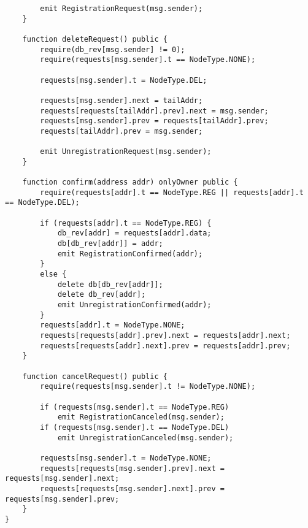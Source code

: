\begin{verbatim}
        emit RegistrationRequest(msg.sender);
    }

    function deleteRequest() public {
        require(db_rev[msg.sender] != 0);
        require(requests[msg.sender].t == NodeType.NONE);

        requests[msg.sender].t = NodeType.DEL;

        requests[msg.sender].next = tailAddr;
        requests[requests[tailAddr].prev].next = msg.sender;
        requests[msg.sender].prev = requests[tailAddr].prev;
        requests[tailAddr].prev = msg.sender;

        emit UnregistrationRequest(msg.sender);
    }

    function confirm(address addr) onlyOwner public {
        require(requests[addr].t == NodeType.REG || requests[addr].t == NodeType.DEL);

        if (requests[addr].t == NodeType.REG) {
            db_rev[addr] = requests[addr].data;
            db[db_rev[addr]] = addr;
            emit RegistrationConfirmed(addr);
        }
        else {
            delete db[db_rev[addr]];
            delete db_rev[addr];
            emit UnregistrationConfirmed(addr);
        }
        requests[addr].t = NodeType.NONE;
        requests[requests[addr].prev].next = requests[addr].next;
        requests[requests[addr].next].prev = requests[addr].prev;
    }

    function cancelRequest() public {
        require(requests[msg.sender].t != NodeType.NONE);

        if (requests[msg.sender].t == NodeType.REG)
            emit RegistrationCanceled(msg.sender);
        if (requests[msg.sender].t == NodeType.DEL)
            emit UnregistrationCanceled(msg.sender);

        requests[msg.sender].t = NodeType.NONE;
        requests[requests[msg.sender].prev].next = requests[msg.sender].next;
        requests[requests[msg.sender].next].prev = requests[msg.sender].prev;
    }
}
\end{verbatim}

